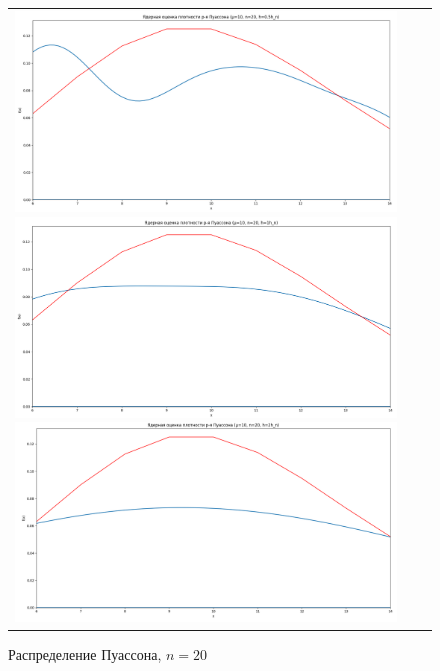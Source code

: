 \begin{figure}[H]
	\begin{tabular}{ccc}
		\includegraphics[scale=0.14]{resources/4_poisson_20_half.png}
		\includegraphics[scale=0.14]{resources/4_poisson_20_one.png}
		\includegraphics[scale=0.14]{resources/4_poisson_20_two.png}
	\end{tabular}
	\caption{Распределение Пуассона, $n=20$}
\end{figure}

